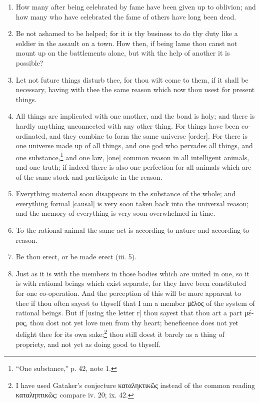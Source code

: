 \begin{enumerate}
\item How many after being celebrated by fame have been given up to oblivion; and how many who have celebrated the fame of others have long been dead.

\item Be not ashamed to be helped; for it is thy business to do thy duty like a soldier in the assault on a town. How then, if being lame thou canst not mount up on the battlements alone, but with the help of another it is possible?

\item Let not future things disturb thee, for thou wilt come to them, if it shall be necessary, having with thee the same reason which now thou usest for present things.

\item All things are implicated with one another, and the bond is holy; and there is hardly anything unconnected with any other thing. For things have been co-ordinated, and they combine to form the same universe [{\clarify order}]. For there is one universe made up of all things, and one god who pervades all things, and one substance,\footnote{ ``One substance," p. 42, note 1.} and one law, [{\clarify one}] common reason in all intelligent animals, and one truth; if indeed there is also one perfection for all animals which are of the same stock and participate in the reason.

\item Everything material soon disappears in the substance of the whole; and everything formal [{\clarify causal}] is very soon taken back into the universal reason; and the memory of everything is very soon overwhelmed in time.

\item To the rational animal the same act is according to nature and according to reason.

\item Be thou erect, or be made erect (iii. 5).

\item Just as it is with the members in those bodies which are united in one, so it is with rational beings which exist separate, for they have been constituted for one co-operation. And the perception of this will be more apparent to thee if thou often sayest to thyself that I am a member \textgreek{μέλος} of the system of rational beings. But if [{\clarify using the letter r}] thou sayest that thou art a part \textgreek{μέρος}, thou dost not yet love men from thy heart; beneficence does not yet delight thee for its own sake;\footnote{I have used Gataker's conjecture \textgreek{καταληκτικῶς} instead of the common reading \textgreek{καταληπτικῶς}: compare iv. 20; ix. 42.} thou still doest it barely as a thing of propriety, and not yet as doing good to thyself.


\end{enumerate}
